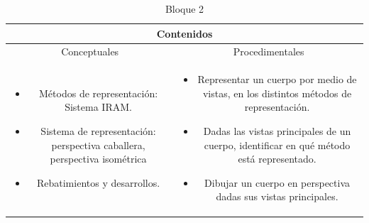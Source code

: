 \documentclass[../main]{subfiles}
\begin{document}
\begin{table}[h]
    \centering
    \begin{tabular}{|c|c|} \hline
         \multicolumn{2}{|c|}{Contenidos} \\ \hline
         Conceptuales & Procedimentales  \\ \hline \hline
        \begin{minipage} [t] {0.4\textwidth} 
            \begin{itemize}
                \item Métodos de representación: Sistema IRAM.
                \item Sistema de representación: perspectiva caballera, perspectiva isométrica 
                \item Rebatimientos y desarrollos.
                
            \end{itemize}
        \end{minipage} &  \begin{minipage} [t] {0.4\textwidth} 
            \begin{itemize}
                \item Representar un cuerpo por medio de vistas, en los distintos métodos de representación.
                \item Dadas las vistas principales de un cuerpo, identificar en qué método está representado.
                \item Dibujar un cuerpo en perspectiva dadas sus vistas principales.
            \end{itemize}
        \end{minipage} \\ \hline
       \end{tabular}
    \caption{Bloque 2}
\end{table}
\end{document}

